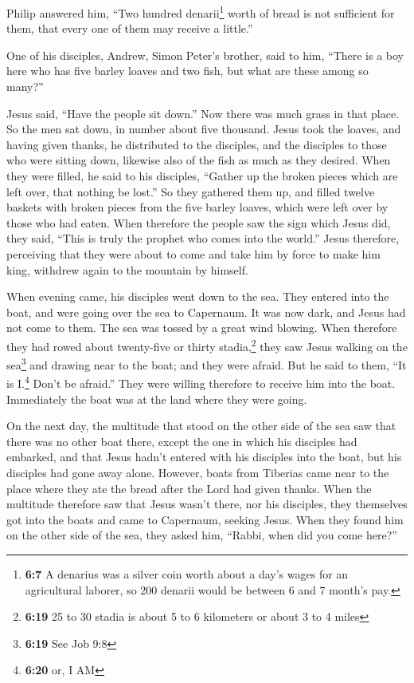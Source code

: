  Philip answered him, ``Two hundred denarii\footnote{\textbf{6:7}
  A denarius was a silver coin worth about a day's wages for an
  agricultural laborer, so 200 denarii would be between 6 and 7 month's
  pay.} worth of bread is not sufficient for them, that every one of
them may receive a little.''

 One of his disciples, Andrew, Simon Peter's brother, said
to him,  ``There is a boy here who has five barley loaves
and two fish, but what are these among so many?''

 Jesus said, ``Have the people sit down.'' Now there was
much grass in that place. So the men sat down, in number about five
thousand.  Jesus took the loaves, and having given
thanks, he distributed to the disciples, and the disciples to those who
were sitting down, likewise also of the fish as much as they desired.
 When they were filled, he said to his disciples,
``Gather up the broken pieces which are left over, that nothing be
lost.''  So they gathered them up, and filled twelve
baskets with broken pieces from the five barley loaves, which were left
over by those who had eaten.  When therefore the people
saw the sign which Jesus did, they said, ``This is truly the prophet who
comes into the world.''  Jesus therefore, perceiving that
they were about to come and take him by force to make him king, withdrew
again to the mountain by himself.

 When evening came, his disciples went down to the sea.
 They entered into the boat, and were going over the sea
to Capernaum. It was now dark, and Jesus had not come to them.
 The sea was tossed by a great wind blowing.
 When therefore they had rowed about twenty-five or
thirty stadia,\footnote{\textbf{6:19} 25 to 30 stadia is about 5 to 6
  kilometers or about 3 to 4 miles} they saw Jesus walking on the
sea\footnote{\textbf{6:19} See Job 9:8} and drawing near to the boat;
and they were afraid.  But he said to them, ``It is
I.\footnote{\textbf{6:20} or, I AM} Don't be afraid.'' 
They were willing therefore to receive him into the boat. Immediately
the boat was at the land where they were going.

 On the next day, the multitude that stood on the other
side of the sea saw that there was no other boat there, except the one
in which his disciples had embarked, and that Jesus hadn't entered with
his disciples into the boat, but his disciples had gone away alone.
 However, boats from Tiberias came near to the place
where they ate the bread after the Lord had given thanks.
 When the multitude therefore saw that Jesus wasn't
there, nor his disciples, they themselves got into the boats and came to
Capernaum, seeking Jesus.  When they found him on the
other side of the sea, they asked him, ``Rabbi, when did you come
here?''

